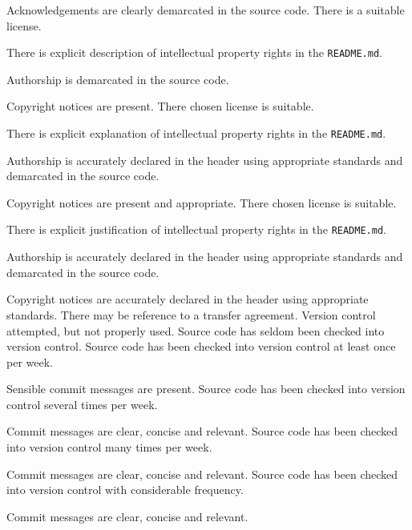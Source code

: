 \documentclass{../../fal_assignment}
\begin{document}
\begin{markingrubric}
            \par Acknowledgements are clearly demarcated in the source code.
        \grade There is a suitable license.
            \par There is explicit description of intellectual property rights in the \texttt{README.md}.
            \par Authorship is demarcated in the source code.
            \par Copyright notices are present.
        \grade There chosen license is suitable. 
            \par There is explicit explanation of intellectual property rights in the \texttt{README.md}.
            \par Authorship is accurately declared in the header using appropriate standards and demarcated in the source code.
            \par Copyright notices are present and appropriate.
        \grade There chosen license is suitable.
            \par There is explicit justification of intellectual property rights in the \texttt{README.md}.
            \par Authorship is accurately declared in the header using appropriate standards and demarcated in the source code.
            \par Copyright notices are accurately declared in the header using appropriate standards. There may be reference to a transfer agreement.
%
        \grade\fail Version control attempted, but not properly used.
        \grade Source code has seldom been checked into version control.
        \grade Source code has been checked into version control at least once per week.
            \par Sensible commit messages are present.
        \grade Source code  has been checked into version control several times per week.
            \par Commit messages are clear, concise and relevant.
        \grade Source code has been checked into version control many times per week.
            \par Commit messages are clear, concise and relevant.
        \grade Source code has been checked into version control with considerable frequency.
            \par Commit messages are clear, concise and relevant.
%
\end{markingrubric}
\end{document}
